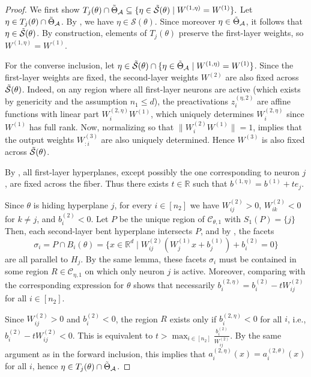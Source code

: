 \documentclass{article}
\theoremstyle{definition}
\newcommand{\R}{\mathbb{R}}
\newcommand{\architecture}{\mathcal{A}}
\newcommand{\gparamspace}[1]{\Tilde{\Theta}_{#1}}
\newcommand{\weights}[1]{W^{(#1)}}
\newcommand{\bias}[1]{b^{(#1)}}
\newcommand{\complex}{\mathcal{C}}
\newcommand{\activation}[1]{a^{(#1)}}
\newcommand{\preactivation}[1]{z^{(#1)}}
\newcommand{\fiber}[1]{\mathcal{S}({#1})}
\newcommand{\gfiber}[1]{\Tilde{\mathcal{S}}({#1})}
\begin{document}
\begin{proof}
We first show
$
T_j(\theta)\cap \gparamspace{\architecture}
\subseteq
\{\eta \in \gfiber{\theta} \mid \weights{1,\eta}=\weights{1}\}.
$
Let $\eta \in T_j(\theta)\cap \gparamspace{\architecture}$. By , we have $\eta \in \fiber{\theta}$. Since moreover $\eta \in \gparamspace{\architecture}$, it follows that $\eta \in \gfiber{\theta}$. By construction, elements of $T_j(\theta)$ preserve the first-layer weights, so $\weights{1,\eta}=\weights{1}$.



For the converse inclusion, let 
$\eta \in \gfiber{\theta} \cap \{ \eta  \in \gparamspace{\architecture} \mid \weights{1,\eta} = \weights{1} \}$. 
Since the first-layer weights are fixed, the second-layer weights $\weights{2}$ are also fixed across $\gfiber{\theta}$. Indeed, 
on any region 
where all first-layer neurons are active (which exists by genericity and the assumption $n_1 \leq d$),  
the preactivations $\preactivation{\eta,2}_i$ are affine functions with linear part $\weights{2,\eta}_i\weights{1}$, which 
uniquely determines 
$\weights{2,\eta}_i$ since $\weights{1}$ has full rank. 
%
Now,
normalizing so that $\|\weights{2}_i\weights{1}\|=1$, 
 implies that the output weights $\weights{3}_{:i}$ are also uniquely determined. 
%
Hence $\weights{3}$ is also fixed across $\gfiber{\theta}$. 

By , all first-layer hyperplanes, except possibly the one corresponding to neuron $j$, are fixed across the fiber. 
Thus there exists $t \in \R$ such that 
\(
\bias{1,\eta} = \bias{1} + t e_j.
\)

 Since $\theta$ is hiding hyperplane $j$, for every $i \in [n_2]$ we have $\weights{2}_{i j} > 0$, $\weights{2}_{i k} < 0$ for $k \neq j$, and $\bias{2}_i < 0$. Let $P$ be the unique region of $\complex_{\theta,1}$ with
$S_1(P) =\{j\}$
Then, each second-layer bent hyperplane intersects $P$, 
 and by , the facets
\[
\sigma_i
=
P \cap B_i(\theta)
=
\{ x \in \R^d \mid \weights{2}_{i j}(\weights{1}_j x + \bias{1}_j) + \bias{2}_i = 0 \}
\]
are all parallel to $H_j$. 
%
By the same lemma, these facets $\sigma_i$ must be contained in some region $R \in \complex_{\eta,1}$ on which only neuron $j$ is active. 
Moreover, comparing with the corresponding expression for $\theta$ shows that necessarily
\(
\bias{2,\eta}_i = \bias{2}_i - t \weights{2}_{i j}
\)
for all $i \in [n_2]$.

Since $\weights{2}_{i j} > 0$ and $\bias{2}_i < 0$, the region $R$ exists only if 
\(
\bias{2,\eta}_i < 0
\)
for all $i$, i.e., 
\(
\bias{2}_i - t \weights{2}_{i j} < 0.
\)
This is equivalent to
\(
t > \max_{i \in [n_2]} \frac{\bias{2}_i}{\weights{2}_{i j}}
\). 
%
By the same argument as in the forward inclusion, this implies that $\activation{2,\eta}_i(x) = \activation{2,\theta}_i(x)$ for all $i$, hence $\eta \in T_j(\theta)\cap \gparamspace{\architecture}$.
\end{proof}
\end{document}
